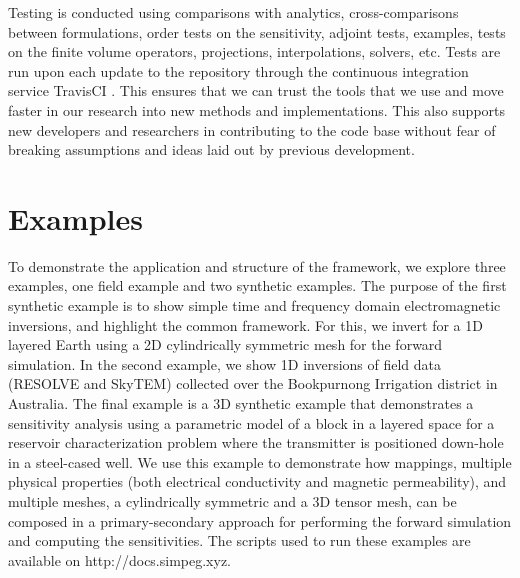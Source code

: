 \documentclass[preprint,review,3p,times,onecolumn,authoryear]{elsarticle}
\begin{document}
Testing is conducted using comparisons with analytics,
cross-comparisons between formulations,
order tests on the sensitivity, adjoint tests, examples, tests on the finite volume operators,
projections, interpolations, solvers, etc. Tests are run upon each
update to the repository through the continuous integration service TravisCI
\citep{Travis}. This ensures that we can trust the tools that we use and move
faster in our research into new methods and implementations. This also
supports new developers and researchers in contributing to the code base without
fear of breaking assumptions and ideas laid out by previous development.



\section{Examples}
\label{sec:Examples}



To demonstrate the application and structure of the framework, we explore three examples, one field example and two synthetic examples.
The purpose of the first synthetic example is to show simple time
and frequency domain electromagnetic inversions, and highlight the common
framework. For this, we invert for a 1D layered Earth using a 2D cylindrically
symmetric mesh for the forward simulation. In the second example, we show 1D inversions of field data (RESOLVE and SkyTEM)
collected over the Bookpurnong Irrigation district in Australia.
The final example is a 3D synthetic example that demonstrates a
sensitivity analysis using a parametric model of a block in a layered space
for a reservoir characterization problem where the transmitter is positioned
down-hole in a steel-cased well. We use this example to demonstrate how
mappings, multiple physical properties (both electrical conductivity and
magnetic permeability), and multiple meshes, a cylindrically symmetric and a
3D tensor mesh, can be composed in a primary-secondary approach for performing
the forward simulation and computing the sensitivities. The scripts used to
run these examples are available on http://docs.simpeg.xyz.



\end{document}
